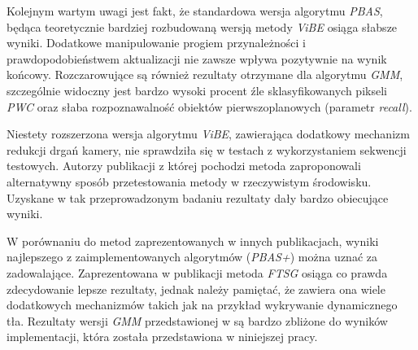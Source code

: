 Kolejnym wartym uwagi jest fakt, że standardowa wersja algorytmu \textit{PBAS}, będąca teoretycznie bardziej rozbudowaną wersją metody \textit{ViBE} osiąga słabsze wyniki. Dodatkowe manipulowanie progiem przynależności i prawdopodobieństwem aktualizacji nie zawsze wpływa pozytywnie na wynik końcowy. Rozczarowujące są również rezultaty otrzymane dla algorytmu \textit{GMM}, szczególnie widoczny jest bardzo wysoki procent źle sklasyfikowanych pikseli \textit{PWC} oraz słaba rozpoznawalność obiektów pierwszoplanowych (parametr \textit{recall}).

Niestety rozszerzona wersja algorytmu \textit{ViBE}, zawierająca dodatkowy mechanizm redukcji drgań kamery, nie sprawdziła się w testach z wykorzystaniem sekwencji testowych. Autorzy publikacji \cite{kryjak_vibe_14} z której pochodzi metoda zaproponowali alternatywny sposób przetestowania metody w rzeczywistym środowisku. Uzyskane w tak przeprowadzonym badaniu rezultaty dały bardzo obiecujące wyniki.

W porównaniu do metod zaprezentowanych w innych publikacjach, wyniki najlepszego z zaimplementowanych algorytmów (\textit{PBAS+}) można uznać za zadowalające. Zaprezentowana w publikacji \cite{wang_14} metoda \textit{FTSG} osiąga co prawda zdecydowanie lepsze rezultaty, jednak należy pamiętać, że zawiera ona wiele dodatkowych mechanizmów takich jak na przykład wykrywanie dynamicznego tła. Rezultaty wersji \textit{GMM} przedstawionej w \cite{} są bardzo zbliżone do wyników implementacji, która została przedstawiona w niniejszej pracy.